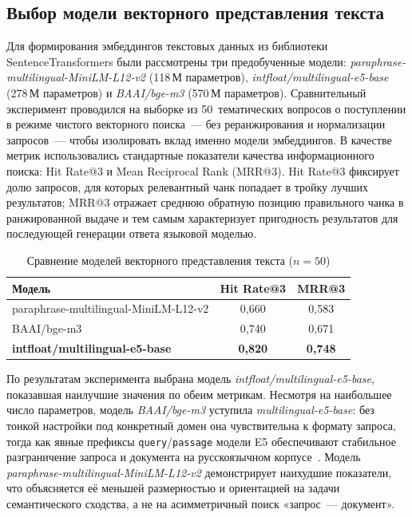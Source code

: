 \documentclass{article}
\begin{document}
\subsection{Выбор модели векторного представления текста}

Для формирования эмбеддингов текстовых данных из библиотеки
SentenceTransformers были рассмотрены три предобученные модели:
\textit{paraphrase-multilingual-MiniLM-L12-v2} (118\,М параметров),
\textit{intfloat/multilingual-e5-base} (278\,М параметров)
и \textit{BAAI/bge-m3} (570\,М параметров).
Сравнительный эксперимент проводился на выборке из 50~тематических
вопросов о поступлении в режиме чистого векторного поиска~---
без реранжирования и нормализации запросов~--- чтобы изолировать
вклад именно модели эмбеддингов.
В качестве метрик использовались стандартные показатели качества
информационного поиска: Hit Rate@3 и Mean Reciprocal Rank (MRR@3). Hit Rate@3 фиксирует долю запросов, для которых релевантный чанк
попадает в тройку лучших результатов; MRR@3 отражает среднюю обратную
позицию правильного чанка в ранжированной выдаче и тем самым
характеризует пригодность результатов для последующей генерации ответа
языковой моделью.

\begin{table}[H]
\centering
\begin{tabular}{lcc}
\hline
\textbf{Модель} & \textbf{Hit Rate@3} & \textbf{MRR@3} \\
\hline
paraphrase-multilingual-MiniLM-L12-v2  & 0{,}660 & 0{,}583 \\
BAAI/bge-m3                            & 0{,}740 & 0{,}671 \\
\textbf{intfloat/multilingual-e5-base} & \textbf{0{,}820} & \textbf{0{,}748} \\
\hline
\end{tabular}
\caption{Сравнение моделей векторного представления текста ($n = 50$)}
\label{tab:embed_comparison}
\end{table}

\noindent По результатам эксперимента выбрана модель \textit{intfloat/multilingual-e5-base},
показавшая наилучшие значения по обеим метрикам.
Несмотря на наибольшее число параметров, модель \textit{BAAI/bge-m3}
уступила \textit{multilingual-e5-base}: без тонкой настройки
под конкретный домен она чувствительна к формату запроса,
тогда как явные префиксы \texttt{query}/\texttt{passage}
модели E5 обеспечивают стабильное разграничение запроса и документа
на русскоязычном корпусе~\cite{4}.
Модель \textit{paraphrase-multilingual-MiniLM-L12-v2} демонстрирует
наихудшие показатели, что объясняется её меньшей размерностью
и ориентацией на задачи семантического сходства,
а не на асимметричный поиск «запрос~--- документ».
\end{document}
